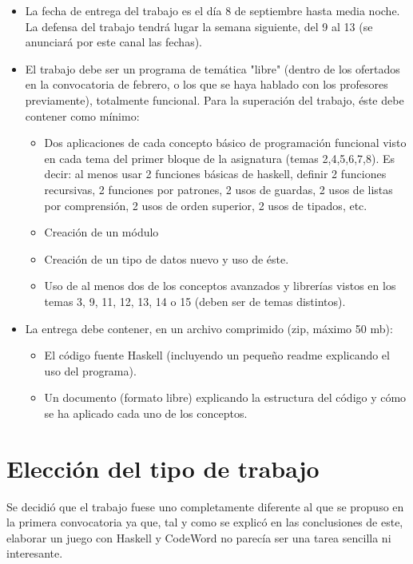 \documentclass[11pt]{article}
\begin{document}
\begin{itemize}
    \item La fecha de entrega del trabajo es el día 8 de septiembre hasta media noche. La defensa del trabajo tendrá lugar la semana siguiente, del 9 al 13 (se anunciará por este canal las fechas).
    \item El trabajo debe ser un programa de temática "libre" (dentro de los ofertados en la convocatoria de febrero, o los que se haya hablado con los profesores previamente), totalmente funcional. Para la superación del trabajo, éste debe contener como mínimo:
    
    \begin{itemize}
        \item Dos aplicaciones de cada concepto básico de programación funcional visto en cada tema del primer bloque de la asignatura (temas 2,4,5,6,7,8). Es decir: al menos usar 2 funciones básicas de haskell, definir 2 funciones recursivas, 2 funciones por patrones, 2 usos de guardas, 2 usos de listas por comprensión, 2 usos de orden superior, 2 usos de tipados, etc.
    \item Creación de un módulo
    \item Creación de un tipo de datos nuevo y uso de éste.
    \item Uso de al menos dos de los conceptos avanzados y librerías vistos en los temas 3, 9, 11, 12, 13, 14 o 15 (deben ser de temas distintos).
    \end{itemize}
    
    
    \item La entrega debe contener, en un archivo comprimido (zip, máximo 50 mb):
    \begin{itemize}
        \item El código fuente Haskell (incluyendo un pequeño readme explicando el uso del programa).
        \item Un documento (formato libre) explicando la estructura del código y cómo se ha aplicado cada uno de los conceptos.
    \end{itemize}


\end{itemize}

\section{Elección del tipo de trabajo}
Se decidió que el trabajo fuese uno completamente diferente al que se propuso en la primera convocatoria \cite{trabajoPrimeraConv} ya que, tal y como se explicó en las conclusiones de este, elaborar un juego con Haskell y CodeWord no parecía ser una tarea sencilla ni interesante. 
\end{document}
